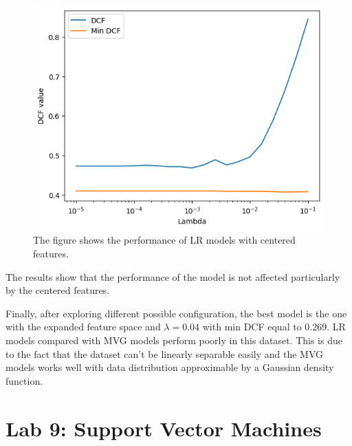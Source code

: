 \documentclass{article}
\begin{document}
\begin{figure}[ht]
    \centering
    \includegraphics[width=\textwidth]{images/lr_lambda_centered.png}
    \caption{The figure shows the performance of LR models with centered features.}
    \label{fig:lr_lambda_centered}
\end{figure}

The results show that the performance of the model is not affected particularly by the centered features.

Finally, after exploring different possible configuration, the best model is the one with the expanded feature space and $\lambda = 0.04$ with min DCF equal to 0.269. LR models compared with MVG models perform poorly in this dataset. This is due to the fact that the dataset can't be linearly separable easily and the MVG models works well with data distribution approximable by a Gaussian density function.

\section{Lab 9: Support Vector Machines}
\label{sec:svm}
\end{document}
